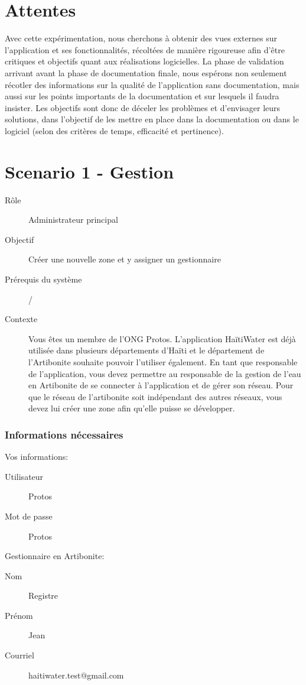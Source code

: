 \documentclass[a4paper, 11pt]{article}
\begin{document}
\section{Attentes}
    Avec cette expérimentation, nous cherchons à obtenir des vues externes sur l'application et ses fonctionnalités, récoltées de manière rigoureuse afin d'être critiques et objectifs quant aux réalisations logicielles. La phase de validation arrivant avant la phase de documentation finale, nous espérons non seulement récotler des informations sur la qualité de l'application sans documentation, mais aussi sur les points importants de la documentation et sur lesquels il faudra insister. Les objectifs sont donc de déceler les problèmes et d'envisager leurs solutions, dans l'objectif de les mettre en place dans la documentation ou dans le logiciel (selon des critères de temps, efficacité et pertinence).

\newpage
\section*{Scenario 1 - Gestion}
    \begin{description}
        \item[Rôle] Administrateur principal
        \item[Objectif] Créer une nouvelle zone et y assigner un gestionnaire
        \item[Prérequis du système] /
        \item[Contexte] Vous êtes un membre de l’ONG Protos. L’application HaïtiWater est déjà utilisée dans plusieurs départements d’Haïti et le département de l’Artibonite souhaite pouvoir l’utiliser également. En tant que responsable de l’application, vous devez permettre au responsable de la gestion de l’eau en Artibonite de se connecter à l’application et de gérer son réseau. Pour que le réseau de l’artibonite soit indépendant des autres réseaux, vous devez lui créer une zone afin qu’elle puisse se développer.
    \end{description}

    \subsubsection*{Informations nécessaires}
        \begin{multicols}{2}
            Vos informations:
            \begin{description}
                \item[Utilisateur] Protos
                \item[Mot de passe] Protos
            \end{description}
            \vfill\null
            \columnbreak

            Gestionnaire en Artibonite:
            \begin{description}
                \item[Nom] Registre
                \item[Prénom] Jean
                \item[Courriel] haitiwater.test@gmail.com
            \end{description}
        \end{multicols}
\end{document}

